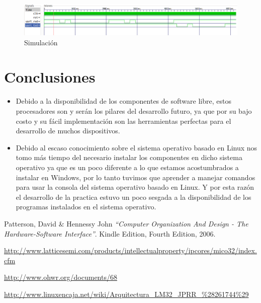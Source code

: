 \documentclass[twocolumn]{IEEEtran}
\begin{document}
\begin{figure}[H]
	\centering
		\includegraphics[scale=0.25]{sim.png}
	\caption{Simulación}
	\label{fig4}
\end{figure}

\section{Conclusiones}
\begin{itemize}
 \item Debido a la disponibilidad de los componentes de software libre, estos procesadores son y serán los pilares del desarrollo futuro, ya que por su bajo costo y su fácil implementación son las herramientas perfectas para el desarrollo de muchos dispositivos.
 \item Debido al escaso conocimiento sobre el sistema operativo basado en Linux nos tomo más tiempo del necesario instalar los componentes en dicho sistema operativo ya que  es un poco diferente a lo que estamos  acostumbrados a instalar en Windows, por lo tanto tuvimos que aprender a manejar comandos para usar la consola del sistema operativo basado en Linux. Y por esta razón el desarrollo de la practica estuvo un poco sesgada a la disponibilidad de los programas instalados en el sistema operativo.
\end{itemize}


\begin{thebibliography}{99}
 Patterson, David \& Hennessy John
{\em "`Computer Organization And Design - The Hardware-Software Interface"'}.
Kindle Edition, Fourth Edition, 2006.

 \url{http://www.latticesemi.com/products/intellectualproperty/ipcores/mico32/index.cfm}

 \url{http://www.ohwr.org/documents/68}

 \url{http://www.linuxencaja.net/wiki/Arquitectura_LM32_JPRR_%28261744%29}
\end{thebibliography}
\end{document}
